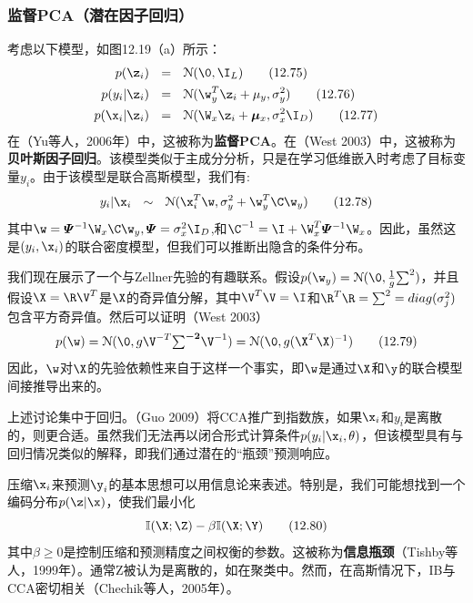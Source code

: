 \documentclass[a4paper]{article}
\begin{document}
\subsubsection{监督PCA（潜在因子回归）}
考虑以下模型，如图12.19（a）所示：
\begin{align}
	p(\z_i)\ \ &=\ \ \mathcal{N}(\0,\I_L)\tag{12.75}\\
	p(y_i|\z_i)\ \ &=\ \ \mathcal{N}(\w_y^T\z_i+\mu_y,\sigma_y^2)\tag{12.76}\\
	p(\x_i|\z_i)\ \ &=\ \ \mathcal{N}(\W_x\z_i+\boldsymbol{\mu}_x,\sigma_x^2\I_D)\tag{12.77}
\end{align}
在（Yu等人，2006年）中，这被称为\textbf{监督PCA}。在（West 2003）中，这被称为\textbf{贝叶斯因子回归}。该模型类似于主成分分析，只是在学习低维嵌入时考虑了目标变量$y_i$。由于该模型是联合高斯模型，我们有:
\begin{equation}
	y_i|\x_i\ \ \sim\ \ \mathcal{N}(\x_i^T\w,\sigma_y^2+\w_y^T\C\w_y)\tag{12.78}
\end{equation}
其中$\w=\boldsymbol{\varPsi}^{-1}\W_x\C\w_y,\boldsymbol{\varPsi}=\sigma_x^2\I_D$,和$\C^{-1}=\I+\W_x^T\boldsymbol{\varPsi}^{-1}\W_x$。因此，虽然这是$(y_i,\x_i)$的联合密度模型，但我们可以推断出隐含的条件分布。

我们现在展示了一个与Zellner先验的有趣联系。假设$p(\w_y)=\mathcal{N}(\0,\frac{1}{g}\textstyle{\sum^2})$，并且假设$\X=\R\V^T$是$\X$的奇异值分解，其中$\V^T\V=\I$和$\R^T\R=\textstyle{\sum^2}=diag(\sigma_j^2)$包含平方奇异值。然后可以证明（West 2003）
\begin{equation}
	p(\w)=\mathcal{N}(\0,g\V^{-T}\boldsymbol{\textstyle{\sum^{-2}}}\V^{-1})=\mathcal{N}(\0,g(\X^T\X)^{-1})\tag{12.79}
\end{equation}
因此，$\w$对$\X$的先验依赖性来自于这样一个事实，即$\w$是通过$\X$和$\y$的联合模型间接推导出来的。 

上述讨论集中于回归。（Guo 2009）将CCA推广到指数族，如果$\x_i$和$y_i$是离散的，则更合适。虽然我们无法再以闭合形式计算条件$p(y_i|\x_i,\theta)$，但该模型具有与回归情况类似的解释，即我们通过潜在的“瓶颈”预测响应。 

压缩$\x_i$来预测$\y_i$的基本思想可以用信息论来表述。特别是，我们可能想找到一个编码分布$p(\z|\x)$，使我们最小化
\begin{equation}
	\mathbb{I}(\X;\Z)-\beta\mathbb{I}(\X;\Y)\tag{12.80}
\end{equation}
其中$\beta\ge0$是控制压缩和预测精度之间权衡的参数。这被称为\textbf{信息瓶颈}（Tishby等人，1999年）。通常Z被认为是离散的，如在聚类中。然而，在高斯情况下，IB与CCA密切相关（Chechik等人，2005年）。 
\end{document}
